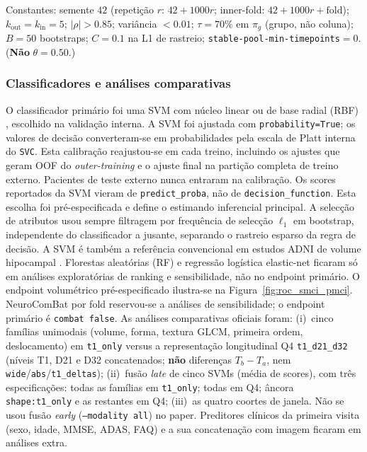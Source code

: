 \documentclass[review]{elsarticle}
\newcommand{\code}[1]{\texttt{#1}}
\begin{document}
Constantes: semente $42$ (repetição $r$: $42+1000r$; inner-fold: $42+1000r+\mathrm{fold}$); $k_{\mathrm{out}}=k_{\mathrm{in}}=5$; $|\rho|>0.85$; variância $<0.01$; $\tau=70\%$ em $\pi_g$ (grupo, não coluna); $B=50$ bootstraps; $C=0.1$ na L1 de rastreio; \code{stable-pool-min-timepoints}$=0$.
(\textbf{Não} $\theta=0.50$.)

\subsubsection{Classificadores e análises comparativas}

O classificador primário foi uma SVM com núcleo linear ou de base radial (RBF) \citep{cortes-1995}, escolhido na validação interna.
A SVM foi ajustada com \code{probability=True}; os valores de decisão converteram-se em probabilidades pela escala de Platt interna do \code{SVC}.
Esta calibração reajustou-se em cada treino, incluindo os ajustes que geram OOF do \emph{outer-training} e o ajuste final na partição completa de treino externo.
Pacientes de teste externo nunca entraram na calibração.
Os scores reportados da SVM vieram de \code{predict\_proba}, não de \code{decision\_function}.
Esta escolha foi pré-especificada e define o estimando inferencial principal.
A selecção de atributos usou sempre filtragem por frequência de selecção $\ell_1$ em bootstrap, independente do classificador a jusante, separando o rastreio esparso da regra de decisão.
A SVM é também a referência convencional em estudos ADNI de volume hipocampal \citep{cuingnet-2011}.
Florestas aleatórias (RF) \citep{breiman-2001} e regressão logística elastic-net \citep{zou-2005} ficaram só em análises exploratórias de ranking e sensibilidade, não no endpoint primário.
O endpoint volumétrico pré-especificado ilustra-se na Figura~\ref{fig:roc_smci_pmci}.
NeuroComBat por fold reservou-se a análises de sensibilidade; o endpoint primário é \code{combat false}.
As análises comparativas oficiais foram: (i)~cinco famílias unimodais (volume, forma, textura GLCM, primeira ordem, deslocamento) em \code{t1\_only} versus a representação longitudinal Q4 \code{t1\_d21\_d32} (níveis T1, D21 e D32 concatenados; \textbf{não} diferenças $T_b-T_a$, nem \code{wide}/\code{abs}/\code{t1\_deltas}); (ii)~fusão \emph{late} de cinco SVMs (média de scores), com três especificações: todas as famílias em \code{t1\_only}; todas em Q4; âncora \code{shape:t1\_only} e as restantes em Q4; (iii)~as quatro coortes de janela.
Não se usou fusão \emph{early} (\code{--modality all}) no paper.
Preditores clínicos da primeira visita (sexo, idade, MMSE, ADAS, FAQ) e a sua concatenação com imagem ficaram em análises extra.
\end{document}
